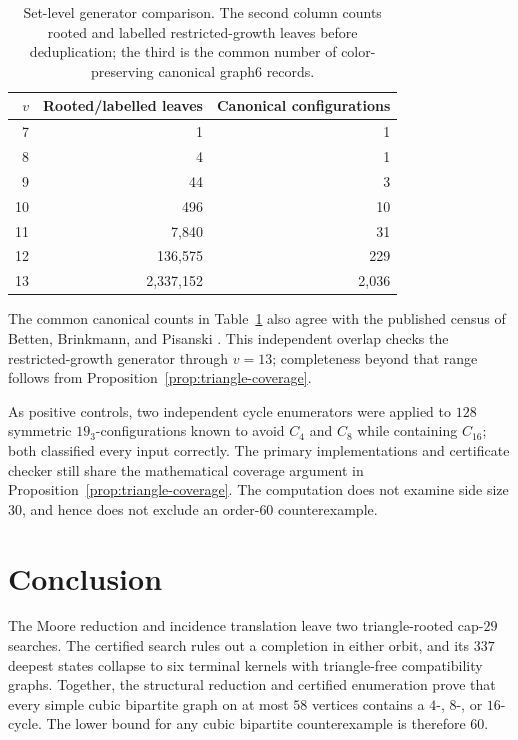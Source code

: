 \documentclass[11pt]{article}
\theoremstyle{definition}
\begin{document}
\begin{table}[ht]
\centering
\small
\caption{Set-level generator comparison. The second column counts rooted
and labelled restricted-growth leaves before deduplication; the third is the
common number of color-preserving canonical graph6 records.}
\label{tab:genbg}
\begin{tabular}{rrr}
\toprule
\(v\) & Rooted/labelled leaves & Canonical configurations\\
\midrule
7  & 1         & 1\\
8  & 4         & 1\\
9  & 44        & 3\\
10 & 496       & 10\\
11 & 7,840     & 31\\
12 & 136,575   & 229\\
13 & 2,337,152 & 2,036\\
\bottomrule
\end{tabular}
\end{table}

The common canonical counts in Table~\ref{tab:genbg} also agree with the
published census of Betten, Brinkmann, and Pisanski
\cite{BettenBrinkmannPisanski2000}. This independent overlap checks the
restricted-growth generator through \(v=13\); completeness beyond that range
follows from Proposition~\ref{prop:triangle-coverage}.

As positive controls, two independent cycle enumerators were applied to
\(128\) symmetric \(19_3\)-configurations known to avoid \(C_4\) and \(C_8\)
while containing \(C_{16}\); both classified every input correctly. The
primary implementations and certificate checker still share the mathematical
coverage argument in Proposition~\ref{prop:triangle-coverage}. The computation
does not examine side size \(30\), and hence does not exclude an order-\(60\)
counterexample.

\section{Conclusion}

The Moore reduction and incidence translation leave two triangle-rooted
cap-\(29\) searches. The certified search rules out a completion in either
orbit, and its \(337\) deepest states collapse to six terminal kernels with
triangle-free compatibility graphs. Together, the structural reduction and
certified enumeration prove that every simple cubic bipartite graph on at most
\(58\) vertices contains a \(4\)-, \(8\)-, or \(16\)-cycle. The lower bound
for any cubic bipartite counterexample is therefore \(60\).
\end{document}
